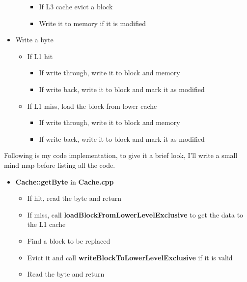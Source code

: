 \documentclass{article}
\begin{document}
\begin{itemize}
\begin{itemize}
\begin{itemize}
                                \item If L3 cache evict a block
                                \item Write it to memory if it is modified
                            \end{itemize}
            \end{itemize}
    \item Write a byte
        \begin{itemize}
            \item If L1 hit
                \begin{itemize}
                    \item If write through, write it to block and memory
                    \item If write back, write it to block and mark it as modified
                \end{itemize}
            \item If L1 miss, load the block from lower cache
                \begin{itemize}
                    \item If write through, write it to block and memory
                    \item If write back, write it to block and mark it as modified
                \end{itemize}
        \end{itemize}
\end{itemize}
Following is my code implementation, to give it a brief look, I'll write a small mind map before listing all the code.
\begin{itemize}
    \item \textbf{Cache::getByte} in \textbf{Cache.cpp}
        \begin{itemize}
            \item If hit, read the byte and return
            \item If miss, call \textbf{loadBlockFromLowerLevelExclusive} to get the data to the L1 cache
            \item Find a block to be replaced
            \item Evict it and call \textbf{writeBlockToLowerLevelExclusive} if it is valid
            \item Read the byte and return
        \end{itemize}
\end{itemize}
\end{document}
